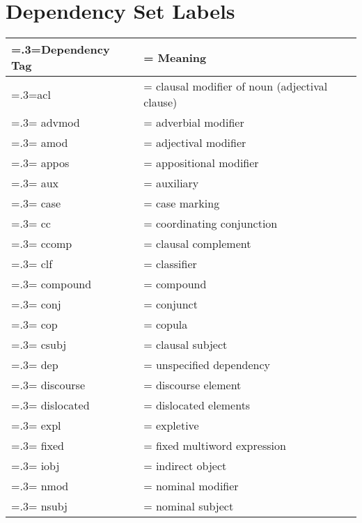 
\chapter{\vspace{-3px}Dependency Set Labels}

\vspace{-3em}
\begin{table}[H]
    \centering
    \renewcommand{\arraystretch}{1.0}
    \begin{tabularx}{0.8\textwidth}{|>{\hsize=.3\hsize\linewidth=\hsize}X|>{\hsize=0.7\hsize\linewidth=\hsize}X|} 
     \hline
      \textbf{Dependency Tag} & \textbf{Meaning} \\
     \hline
        acl & clausal modifier of noun (adjectival clause) \\
        \hline
        advmod & adverbial modifier \\
        \hline
        amod & adjectival modifier \\
        \hline
        appos & appositional modifier \\
        \hline
        aux & auxiliary \\
        \hline
        case & case marking \\
        \hline
        cc & coordinating conjunction \\
        \hline
        ccomp & clausal complement \\
        \hline
        clf & classifier \\
        \hline
        compound & compound \\
        \hline
        conj & conjunct \\
        \hline
        cop & copula \\
        \hline
        csubj & clausal subject \\
        \hline
        dep & unspecified dependency \\
        \hline
        discourse & discourse element \\
        \hline
        dislocated & dislocated elements \\
        \hline
        expl & expletive \\
        \hline
        fixed & fixed multiword expression \\
        \hline
        iobj & indirect object \\
        \hline
        nmod & nominal modifier \\
        \hline
        nsubj & nominal subject \\

\end{tabularx}
\end{table}
